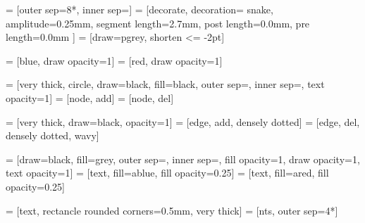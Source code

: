  = [outer sep=8*\nodespacing, inner sep=\nodesize]
 = [decorate,
                    decoration={%
                        snake,
                        amplitude=0.25mm,
                        segment length=2.7mm,
                        post length=0.0mm,
                        pre length=0.0mm
                    }]
 = [draw=pgrey, shorten <= -2pt]

 = [blue, draw opacity=1]
 = [red, draw opacity=1]

 = [very thick,
                    circle,
                    draw=black,
                    fill=black,
                    outer sep=\nodespacing,
                    inner sep=\nodesize,
                    text opacity=1]
 = [node, add]
 = [node, del]

 = [very thick, draw=black, opacity=1]
 = [edge, add, densely dotted]
 = [edge, del, densely dotted, wavy]

 = [draw=black,  %
                    fill=grey,
                    outer sep=\nodespacing,
                    inner sep=\nodesize,
                    fill opacity=1,
                    draw opacity=1,
                    text opacity=1]
 = [text, fill=ablue, fill opacity=0.25]
 = [text, fill=ared, fill opacity=0.25]

 = [text,
                   rectancle
                   rounded corners=0.5mm,
                   very thick]
 = [nts, outer sep=4*\nodespacing]
